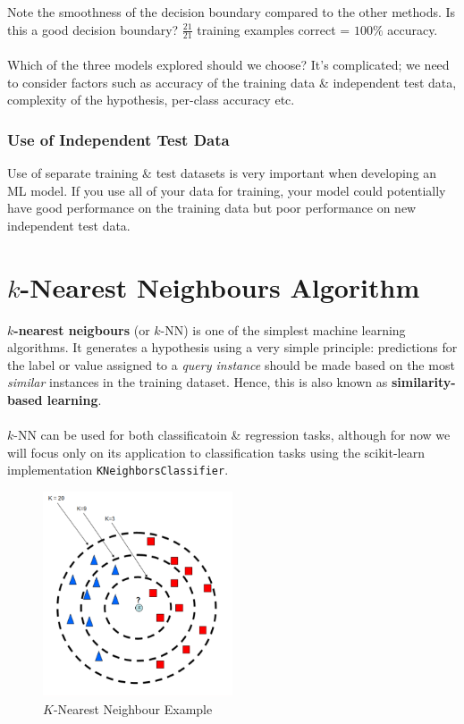 \documentclass[a4paper,11pt]{article}
\begin{document}
Note the smoothness of the decision boundary compared to the other methods.
Is this a good decision boundary?
$\frac{21}{21}$ training examples correct = $100\%$ accuracy.
\\\\
Which of the three models explored should we choose?
It's complicated; we need to consider factors such as accuracy of the training data \& independent test data,
complexity of the hypothesis, per-class accuracy etc.

\subsubsection{Use of Independent Test Data}
Use of separate training \& test datasets is very important when developing an ML model.
If you use all of your data for training, your model could potentially have good performance on the training data
but poor performance on new independent test data.


\section{$k$-Nearest Neighbours Algorithm}
\textbf{$k$-nearest neigbours} (or $k$-NN) is one of the simplest machine learning algorithms.
It generates a hypothesis using a very simple principle: predictions for the label or value assigned to a \textit{query instance} should be made based on the most \textit{similar} instances in the training dataset.
Hence, this is also known as \textbf{similarity-based learning}.
\\\\
$k$-NN can be used for both classificatoin \& regression tasks, although for now we will focus only on its application to classification tasks using the scikit-learn implementation \texttt{KNeighborsClassifier}.

\begin{figure}[H]
    \centering
    \includegraphics[width=0.5\textwidth]{images/knn.png}
    \caption{$K$-Nearest Neighbour Example}
\end{figure}
\end{document}
